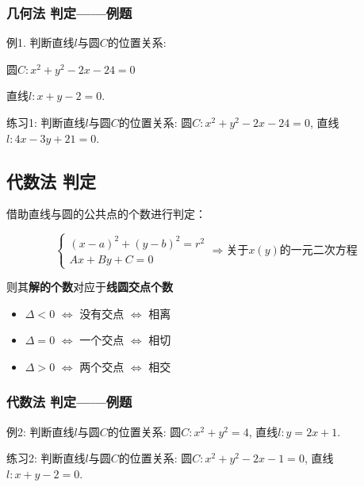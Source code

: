 \documentclass[10pt,a4paper]{article}
\begin{document}
\subsubsection{几何法 判定——例题}

			\textcolor[rgb]{0.15,0.7,0.15}{例1.} 判断直线$l$与圆$C$的位置关系:

			圆$C: x^2+y^2-2x-24=0$

			直线$l: x+y-2=0$. \vspace{40pt}

			\textcolor[rgb]{0.15,0.7,0.15}{练习1: }判断直线$l$与圆$C$的位置关系: 圆$C: x^2+y^2-2x-24=0$, \hspace{5pt}直线$l: 4x-3y+21=0$.

\subsection{代数法 判定}

借助直线与圆的公共点的个数进行判定：

\begin{displaymath}
\left\{ \begin{array}{l}
(x-a)^2+(y-b)^2=r^2 \\
Ax+By+C=0
\end{array} \right.
\Longrightarrow
\textbf{关于$x(y)$的一元二次方程}
\end{displaymath}

则其\textbf{解的个数}对应于\textbf{线圆交点个数}
\begin{itemize}
	\item $\Delta < 0$ $\Longleftrightarrow$ 没有交点 $\Longleftrightarrow$ 相离
	\item $\Delta = 0$ $\Longleftrightarrow$ 一个交点 $\Longleftrightarrow$ 相切
	\item $\Delta > 0$ $\Longleftrightarrow$ 两个交点 $\Longleftrightarrow$ 相交
\end{itemize}

\subsubsection{代数法 判定——例题}

			\textcolor[rgb]{0.15,0.7,0.15}{例2: }判断直线$l$与圆$C$的位置关系: 圆$C: x^2+y^2=4$, 直线$l: y=2x+1$. \vspace{22pt}

			\textcolor[rgb]{0.15,0.7,0.15}{练习2: }判断直线$l$与圆$C$的位置关系: 圆$C: x^2+y^2-2x-1=0$, \hspace{2pt}
			直线$l: x+y-2=0$.
\end{document}
